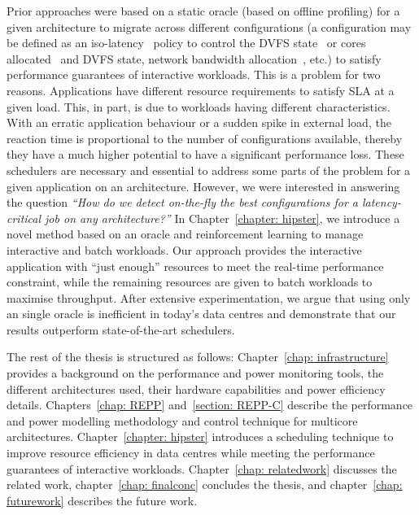 Prior approaches were based on a static oracle (based on offline profiling)
for a given architecture to migrate across different configurations (a configuration may
be defined as an iso-latency~\citep{Lo2015Heracles} policy to control the DVFS
state~\citep{Kasture2015Rubik} or cores
allocated~\citep{Petrucci2015Octopus-Man:Computers} and DVFS state, network bandwidth
allocation~\citep{NCAP:HPCA}, etc.) to satisfy performance guarantees of interactive
workloads.  This is a problem for two reasons.  {\small{}} Applications have
different resource requirements to satisfy SLA at a given load.  This, in part, is due to
workloads having different characteristics.  {\small{}} With an erratic
application behaviour or a sudden spike in external load, the reaction time is
proportional to the number of configurations available, thereby they have a much higher
potential to have a significant performance loss. These schedulers are necessary and
essential to address some parts of the problem for a given application on an architecture.
However, we were interested in answering the question \emph{``How do we detect on-the-fly
the best configurations for a latency-critical job on any architecture?''} In
Chapter~\ref{chapter: hipster},  we introduce a novel method based on an oracle and
reinforcement learning to manage interactive and batch workloads.  Our approach provides
the interactive application with ``just enough'' resources to meet the real-time
performance constraint, while the remaining resources are given to batch workloads to
maximise throughput. After extensive experimentation, we argue that using only an single
oracle is inefficient in today's data centres and demonstrate that our results outperform
state-of-the-art schedulers. 


 The rest of the thesis is structured as follows: Chapter~\ref{chap:
infrastructure} provides a background on the performance and power monitoring tools, the
different architectures used, their hardware capabilities and power efficiency details.
Chapters~\ref{chap: REPP} and~\ref{section: REPP-C} describe the performance and power
modelling methodology and control technique for multicore architectures.
Chapter~\ref{chapter: hipster} introduces a scheduling technique to improve resource
efficiency in data centres while meeting the performance guarantees of interactive
workloads.  Chapter~\ref{chap: relatedwork} discusses the related work, chapter~\ref{chap:
finalconc} concludes the thesis, and chapter~\ref{chap: futurework} describes the future
work.

